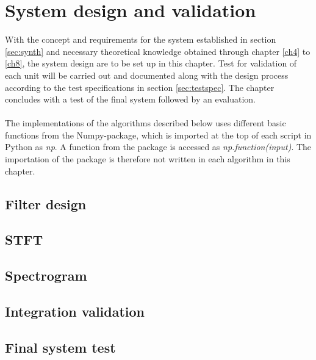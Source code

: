 \chapter{System design and validation} \label{ch10}
With the concept and requirements for the system established in section \ref{sec:synth} and necessary theoretical knowledge obtained through chapter \ref{ch4} to \ref{ch8}, the system design are to be set up in this chapter. Test for validation of each unit will be carried out and documented along with the design process according to the test specifications in section \ref{sec:testspec}. The chapter concludes with a test of the final system followed by an evaluation.
\\ \\
The implementations of the algorithms described below uses different basic functions from the Numpy-package, which is imported at the top of each script in Python as \textit{np}. A function from the package is accessed as \textit{np.function(input)}. The importation of the package is therefore not written in each algorithm in this chapter.



\section{Filter design}


\section{STFT}


\section{Spectrogram}

\section{Integration validation}

\section{Final system test}

